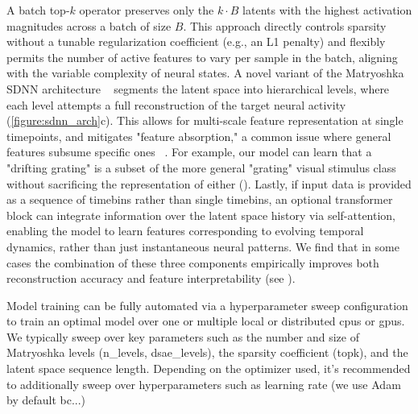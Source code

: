 A batch top-$k$ operator preserves only the $k \cdot B$ latents with the highest activation magnitudes across a batch of size $B$. This approach directly controls sparsity without a tunable regularization coefficient (e.g., an L1 penalty) and flexibly permits the number of active features to vary per sample in the batch, aligning with the variable complexity of neural states. A novel variant of the Matryoshka SDNN architecture ~\cite{bussmann_2025_msae} segments the latent space into hierarchical levels, where each level attempts a full reconstruction of the target neural activity (\autoref{figure:sdnn_arch}c). This allows for multi-scale feature representation at single timepoints, and mitigates "feature absorption," a common issue where general features subsume specific ones ~\cite{chanin_2024_feature_absorption}. For example, our model can learn that a "drifting grating" is a subset of the more general "grating" visual stimulus class without sacrificing the representation of either (). Lastly, if input data is provided as a sequence of timebins rather than single timebins, an optional transformer block can integrate information over the latent space history via self-attention, enabling the model to learn features corresponding to evolving temporal dynamics, rather than just instantaneous neural patterns. We find that in some cases the combination of these three components empirically improves both reconstruction accuracy and feature interpretability (see ).

Model training can be fully automated via a hyperparameter sweep configuration to train an optimal model over one or multiple local or distributed cpus or gpus. We typically sweep over key parameters such as the number and size of Matryoshka levels (n\_levels, dsae\_levels), the sparsity coefficient (topk), and the latent space sequence length. Depending on the optimizer used, it's recommended to additionally sweep over hyperparameters such as learning rate (we use Adam by default bc...)

